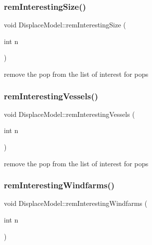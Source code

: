 \mbox{\label{class_displace_model_acf4a0bf8faf1310309e0223bd165c6b1}} 
\subsubsection{\texorpdfstring{remInterestingSize()}{remInterestingSize()}}
{\footnotesize\ttfamily void Displace\+Model\+::rem\+Interesting\+Size (\begin{DoxyParamCaption}\item[{int}]{n }\end{DoxyParamCaption})}



remove the pop from the list of interest for pops 

\mbox{\label{class_displace_model_a44c27d06d644f3087b058875c4341bd0}} 
\subsubsection{\texorpdfstring{remInterestingVessels()}{remInterestingVessels()}}
{\footnotesize\ttfamily void Displace\+Model\+::rem\+Interesting\+Vessels (\begin{DoxyParamCaption}\item[{int}]{n }\end{DoxyParamCaption})\hspace{0.3cm}{\ttfamily [inline]}}



remove the pop from the list of interest for pops 

\mbox{\label{class_displace_model_a9ad74a84c8570629d8fb2b7bf3544ad6}} 
\subsubsection{\texorpdfstring{remInterestingWindfarms()}{remInterestingWindfarms()}}
{\footnotesize\ttfamily void Displace\+Model\+::rem\+Interesting\+Windfarms (\begin{DoxyParamCaption}\item[{int}]{n }\end{DoxyParamCaption})\hspace{0.3cm}{\ttfamily [inline]}}

